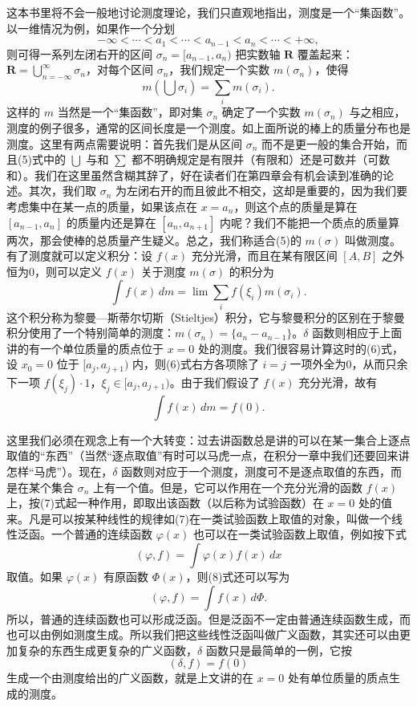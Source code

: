 这本书里将不会一般地讨论测度理论，我们只直观地指出，测度是一个“集函数”。以一维情况为例，如果作一个分划
\[
-\infty<\cdots<a_1<\cdots<a_{n-1}<a_n<\cdots<+\infty,
\]
则可得一系列左闭右开的区间 $\sigma_n=[a_{n-1},a_n)$ 把实数轴 $\mathbf R$ 覆盖起来：$\mathbf R=\bigcup_{n=-\infty}^{\infty}\sigma_n$，对每个区间 $\sigma_n$，我们规定一个实数 $m(\sigma_n)$，使得
\[
m\!\left(\bigcup \sigma_i\right)=\sum_i m(\sigma_i).
\tag{5}
\]
这样的 $m$ 当然是一个“集函数”，即对集 $\sigma_n$ 确定了一个实数 $m(\sigma_n)$ 与之相应，测度的例子很多，通常的区间长度是一个测度。如上面所说的棒上的质量分布也是测度。这里有两点需要说明：首先我们是从区间 $\sigma_n$ 而不是更一般的集合开始，而且(5)式中的 $\bigcup$ 与和 $\sum$ 都不明确规定是有限并（有限和）还是可数并（可数和）。我们在这里虽然含糊其辞了，好在读者们在第四章会有机会读到准确的论述。其次，我们取 $\sigma_n$ 为左闭右开的而且彼此不相交，这却是重要的，因为我们要考虑集中在某一点的质量，如果该点在 $x=a_n$，则这个点的质量是算在 $[a_{n-1},a_n]$ 的质量内还是算在 $[a_n,a_{n+1}]$ 内呢？我们不能把一个质点的质量算两次，那会使棒的总质量产生疑义。总之，我们称适合(5)的 $m(\sigma)$ 叫做测度。有了测度就可以定义积分：设 $f(x)$ 充分光滑，而且在某有限区间 $[A,B]$ 之外恒为0，则可以定义 $f(x)$ 关于测度 $m(\sigma)$ 的积分为
\[
\int f(x)\,dm=\lim\sum_i f(\xi_i)m(\sigma_i).
\tag{6}
\]
这个积分称为黎曼—斯蒂尔切斯（Stieltjes）积分，它与黎曼积分的区别在于黎曼积分使用了一个特别简单的测度：$m(\sigma_n)=\{a_n-a_{n-1}\}$。$\delta$ 函数则相应于上面讲的有一个单位质量的质点位于 $x=0$ 处的测度。我们很容易计算这时的(6)式，设 $x_0=0$ 位于 $[a_j,a_{j+1})$ 内，则(6)式右方各项除了 $i=j$ 一项外全为0，从而只余下一项 $f(\xi_j)\cdot1$，$\xi_j\in[a_j,a_{j+1})$。由于我们假设了 $f(x)$ 充分光滑，故有
\[
\int f(x)\,dm=f(0).
\tag{7}
\]

这里我们必须在观念上有一个大转变：过去讲函数总是讲的可以在某一集合上逐点取值的“东西”（当然“逐点取值”有时可以马虎一点，在积分一章中我们还要回来讲怎样“马虎”）。现在，$\delta$ 函数则对应于一个测度，测度可不是逐点取值的东西，而是在某个集合 $\sigma_n$ 上有一个值。但是，它可以作用在一个充分光滑的函数 $f(x)$ 上，按(7)式起一种作用，即取出该函数（以后称为试验函数）在 $x=0$ 处的值来。凡是可以按某种线性的规律如(7)在一类试验函数上取值的对象，叫做一个线性泛函。一个普通的连续函数 $\varphi(x)$ 也可以在一类试验函数上取值，例如按下式
\[
(\varphi,f)=\int \varphi(x)f(x)\,dx
\tag{8}
\]
取值。如果 $\varphi(x)$ 有原函数 $\Phi(x)$，则(8)式还可以写为
\[
(\varphi,f)=\int f(x)\,d\Phi.
\]
所以，普通的连续函数也可以形成泛函。但是泛函不一定由普通连续函数生成，而也可以由例如测度生成。所以我们把这些线性泛函叫做广义函数，其实还可以由更加复杂的东西生成更复杂的广义函数，$\delta$ 函数只是最简单的一例，它按
\[
(\delta,f)=f(0)
\tag{9}
\]
生成一个由测度给出的广义函数，就是上文讲的在 $x=0$ 处有单位质量的质点生成的测度。

